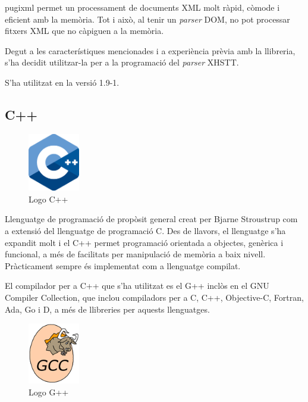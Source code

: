 \documentclass[11pt,a4paper,twoside]{report}
\begin{document}
  pugixml permet un processament de documents XML molt ràpid, còmode i eficient amb la memòria. Tot i això, al tenir un \textit{parser} DOM, no pot processar fitxers XML que no càpiguen a la memòria.
  
  Degut a les característiques mencionades i a experiència prèvia amb la llibreria, s'ha decidit utilitzar-la per a la programació del \textit{parser} XHSTT. 

  S'ha utilitzat en la versió 1.9-1.

  \subsection{C++}
  \begin{figure}[ht!]
    \centering
    \includegraphics[width=0.2\textwidth]{Diagrames/cpp.png}
    \caption{Logo C++}
    \label{fig:cpp}
  \end{figure}
  
  Llenguatge de programació de propòsit general creat per Bjarne Stroustrup com a extensió del llenguatge de programació C. 
  Des de llavors, el llenguatge s'ha expandit molt i el C++ permet programació orientada a objectes, genèrica i funcional, a més de facilitats per manipulació de memòria a baix nivell. 
  Pràcticament sempre és implementat com a llenguatge compilat.

  El compilador per a C++ que s'ha utilitzat es el G++ inclòs en el GNU Compiler Collection, que inclou compiladors per a C, C++, Objective-C, Fortran, Ada, Go i D, a més de llibreries per aquests llenguatges. 
  

  \begin{figure}[ht!]
    \centering
    \includegraphics[width=0.2\textwidth]{Diagrames/gcc.png}
    \caption{Logo G++}
    \label{fig:gpp}
  \end{figure}
\end{document}

